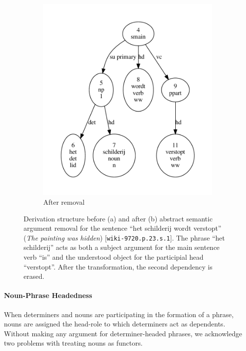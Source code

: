 \begin{figure}[t]
\begin{subfigure}[t]{0.49\textwidth}
        \includegraphics[scale=0.49]{Figures/abs2.pdf}
        \caption{After removal}
    \end{subfigure}\vfill
    \caption[Abstract Semantic Argument Removal]{Derivation structure before (a) and after (b) abstract semantic argument removal for the sentence ``het schilderij wordt verstopt'' (\textit{The painting was hidden}) [\texttt{wiki-9720.p.23.s.1}]. The phrase ``het schilderij'' acts as both a subject argument for the main sentence verb ``is'' and the understood object for the participial head ``verstopt''. After the transformation, the second dependency is erased. }
    \label{fig:abstract_arg}
\end{figure}

\paragraph{Noun-Phrase Headedness}
When determiners and nouns are participating in the formation of a phrase, nouns are assigned the head-role to which determiners act as dependents.
Without making any argument for determiner-headed phrases, we acknowledge two problems with treating nouns as functors.

